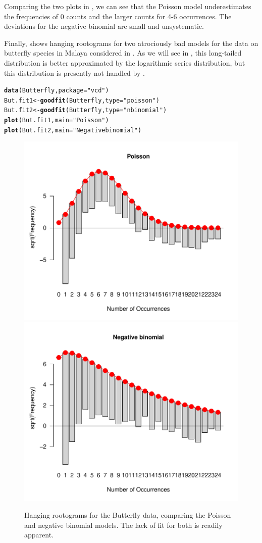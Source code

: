 \documentclass[11pt]{book}\usepackage[]{graphicx}\usepackage[]{color}
\makeatletter
\newcommand{\hlstr}[1]{\textcolor[rgb]{0.192,0.494,0.8}{#1}}%
\newcommand{\hlstd}[1]{\textcolor[rgb]{0.345,0.345,0.345}{#1}}%
\newcommand{\hlkwb}[1]{\textcolor[rgb]{0.69,0.353,0.396}{#1}}%
\newcommand{\hlkwc}[1]{\textcolor[rgb]{0.333,0.667,0.333}{#1}}%
\newcommand{\hlkwd}[1]{\textcolor[rgb]{0.737,0.353,0.396}{\textbf{#1}}}%
\newenvironment{kframe}{%
 \def\at@end@of@kframe{}%
 \ifinner\ifhmode%
  \def\at@end@of@kframe{\end{minipage}}%
  \begin{minipage}{\columnwidth}%
 \fi\fi%
 \def\FrameCommand##1{\hskip\@totalleftmargin \hskip-\fboxsep
 \colorbox{shadecolor}{##1}\hskip-\fboxsep
     \hskip-\linewidth \hskip-\@totalleftmargin \hskip\columnwidth}%
 \MakeFramed {\advance\hsize-\width
   \@totalleftmargin\z@ \linewidth\hsize
   \@setminipage}}%
 {\par\unskip\endMakeFramed%
 \at@end@of@kframe}
\newenvironment{knitrout}{}{} %
\renewenvironment{knitrout}{\small\renewcommand{\baselinestretch}{.85}}{} %
\makeatother
\begin{document}
Comparing the two plots in , we can see that the Poisson model underestimates the frequencies of 0 counts and the larger counts for 4-6 occurrences.
The deviations for the negative binomial are small and unsystematic.

Finally,  shows hanging rootograms for two 
atrociously bad models for the data on butterfly species in Malaya
considered in . As we will see in ,
this long-tailed distribution is better approximated by the logarithmic series
distribution, but this distribution is presently not handled by .
\begin{knitrout}
\color{fgcolor}\begin{kframe}
\begin{alltt}
\hlkwd{data}\hlstd{(Butterfly,} \hlkwc{package}\hlstd{=}\hlstr{"vcd"}\hlstd{)}
\hlstd{But.fit1} \hlkwb{<-} \hlkwd{goodfit}\hlstd{(Butterfly,} \hlkwc{type}\hlstd{=}\hlstr{"poisson"}\hlstd{)}
\hlstd{But.fit2} \hlkwb{<-} \hlkwd{goodfit}\hlstd{(Butterfly,} \hlkwc{type}\hlstd{=}\hlstr{"nbinomial"}\hlstd{)}
\hlkwd{plot}\hlstd{(But.fit1,} \hlkwc{main}\hlstd{=}\hlstr{"Poisson"}\hlstd{)}
\hlkwd{plot}\hlstd{(But.fit2,} \hlkwc{main}\hlstd{=}\hlstr{"Negative binomial"}\hlstd{)}
\end{alltt}
\end{kframe}\begin{figure}[htbp]


\centerline{\includegraphics[width=.48\textwidth]{ch03/fig/But-fit1} 
\includegraphics[width=.48\textwidth]{ch03/fig/But-fit2} }

\caption[Hanging rootograms for the Butterfly data, comparing the Poisson and negative binomial models]{Hanging rootograms for the Butterfly data, comparing the Poisson and negative binomial models. The lack of fit for both is readily apparent.\label{fig:But-fit}}
\end{figure}


\end{knitrout}
\end{document}
